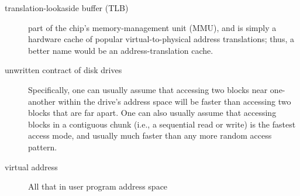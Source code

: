 \begin{description}
\item[translation-lookaside buffer (TLB)] part of the chip’s memory-management unit (MMU), and is simply a hardware cache of popular virtual-to-physical address translations; thus, a better name would be an address-translation cache.


\item[unwritten contract of disk drives] Specifically, one can usually assume that accessing two blocks near one-another within the drive’s address space will be faster than accessing two blocks that are far apart. One can also usually assume that accessing blocks in a contiguous chunk (i.e., a sequential read or write) is the fastest access mode, and usually much faster than any more random access pattern.

\item[virtual address] All that in user program address space



\end{description}
